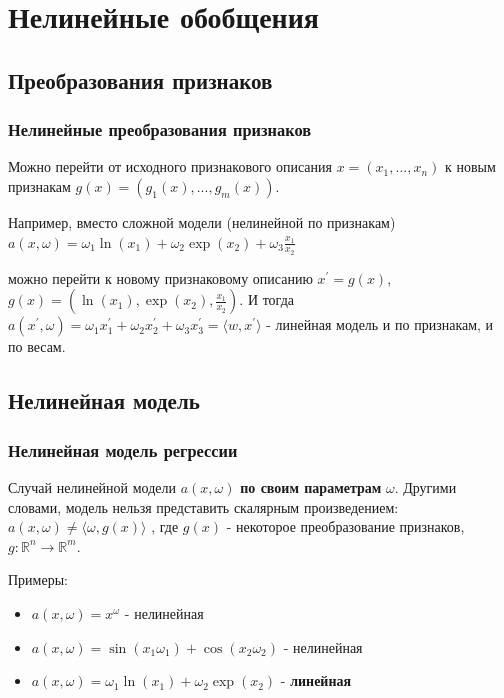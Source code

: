 \documentclass{beamer}
\begin{document}
	
	
	\section{Нелинейные обобщения}
	
	\subsection{Преобразования признаков}
	
	\begin{frame}
		\frametitle{Нелинейные преобразования признаков}
		Можно перейти от исходного признакового описания $x = (x_1, ..., x_n)$  к новым признакам $g(x) = (g_1(x), ..., g_m(x))$.
		
		\vspace{15pt}
		
		Например, вместо сложной модели (нелинейной по признакам)
		$a(x, \omega) = \omega_1 \ln(x_1) + \omega_2 \exp(x_2) + \omega_3 \frac{x_1}{x_2}$
		
		можно перейти к новому признаковому описанию $x^{'} = g(x)$, $g(x) = (\ln(x_1), \exp(x_2), \frac{x_1}{x_2})$.
		И тогда $a(x^{'}, \omega) = \omega_1 x_1^{'} + \omega_2 x_2^{'} + \omega_3 x_3^{'} = \langle w, x^{'} \rangle$ - линейная модель и по признакам, и по весам.
	\end{frame}
	
	\subsection{Нелинейная модель}
	
	\begin{frame}
		\frametitle{Нелинейная модель регрессии}
		Случай нелинейной модели $a(x, \omega)$ \textbf{по своим параметрам} $\omega$. Другими словами, модель нельзя представить скалярным произведением: $a(x, \omega) \ne \langle \omega, g(x) \rangle$ , где $g(x)$ - некоторое преобразование признаков, $g: \mathbb{R}^n \rightarrow \mathbb{R}^m$.
		
		\vspace{15pt}
		
		Примеры:
		\begin{itemize}
			\item $a(x, \omega) = x^{\omega}$ - нелинейная
			\item $a(x, \omega) = \sin(x_1 \omega_1) + \cos(x_2 \omega_2)$ - нелинейная
			\item $a(x, \omega) = \omega_1 \ln(x_1) + \omega_2 \exp(x_2)$ - \textbf{линейная}
		\end{itemize}
	\end{frame}
	
\end{document}
